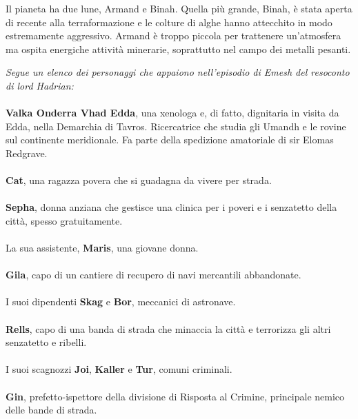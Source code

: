 Il pianeta ha due lune, Armand e Binah. Quella più grande, Binah, è
stata aperta di recente alla terraformazione e le colture di alghe hanno
attecchito in modo estremamente aggressivo. Armand è troppo piccola per
trattenere un'atmosfera ma ospita energiche attività minerarie,
soprattutto nel campo dei metalli pesanti.

\textit{Segue un elenco dei personaggi che appaiono nell'episodio di Emesh del
resoconto di lord Hadrian:}
\leavevmode\\
\leavevmode\\
\phantom{123}\textbf{Valka Onderra Vhad Edda}, una xenologa e, di fatto, dignitaria
in visita da Edda, nella Demarchia di Tavros. Ricercatrice che studia
gli Umandh e le rovine sul continente meridionale. Fa parte della
spedizione amatoriale di sir Elomas Redgrave.
\leavevmode\\
\leavevmode\\
\phantom{123}\textbf{Cat}, una ragazza povera che si guadagna da vivere per strada.
\leavevmode\\
\leavevmode\\
\phantom{123}\textbf{Sepha}, donna anziana che gestisce una clinica per i poveri e i
senzatetto della città, spesso gratuitamente.
\leavevmode\\
\leavevmode\\
\phantom{123}La sua assistente, \textbf{Maris}, una giovane donna.
\leavevmode\\
\leavevmode\\
\phantom{123}\textbf{Gila}, capo di un cantiere di recupero di navi mercantili
abbandonate.
\leavevmode\\
\leavevmode\\
\phantom{123}I suoi dipendenti \textbf{Skag} e \textbf{Bor}, meccanici di astronave.
\leavevmode\\
\leavevmode\\
\phantom{123}\textbf{Rells}, capo di una banda di strada che minaccia la città e
terrorizza gli altri senzatetto e ribelli.
\leavevmode\\
\leavevmode\\
\phantom{123}I suoi scagnozzi \textbf{Joi}, \textbf{Kaller} e \textbf{Tur}, comuni
criminali.
\leavevmode\\
\leavevmode\\
\phantom{123}\textbf{Gin}, prefetto-ispettore della divisione di Risposta al Crimine,
principale nemico delle bande di strada.
\leavevmode\\
\leavevmode\\
